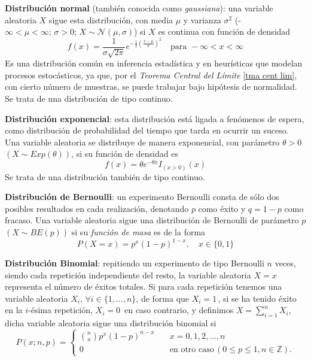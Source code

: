 {\bf Distribución normal} (también conocida como \textsl{gaussiana}): una variable aleatoria $X$ sigue esta distribución, con media $\mu$ y varianza $\sigma^2$ (-$\infty < \mu < \infty;\, \sigma > 0$; $X \sim \mathcal{N}\left(\mu, \sigma\right)$) si $X$ es continua con función de densidad
\begin{equation*}
    f(x) = \frac{1}{\sigma \sqrt{2\pi}} e^{-\frac{1}{2} \left(\frac{x - \mu}{\sigma}\right)^2}
    \quad \text{para } -\infty < x < \infty
\end{equation*}
Es una distribución común en inferencia estadística y en heurísticas que modelan procesos estocásticos, ya que, por el {\sl Teorema Central del Límite} \ref{tma cent lim}, con cierto número de muestras, se puede trabajar bajo hipótesis de normalidad. Se trata de una distribución de tipo continuo.

{\bf Distribución exponencial}: esta distribución está ligada a fenómenos de espera, como distribución de probabilidad del tiempo que tarda en ocurrir un suceso. Una variable aleatoria se distribuye de manera exponencial, con parámetro $\theta > 0$ $\left(X \sim Exp\left(\theta\right)\right)$, si su función de densidad es
\begin{equation*}
    f(x) = \theta e^{-\theta x} I_{(x>0)}(x)
    \label{eq:exponential_distribution}
\end{equation*}
Se trata de una distribución también de tipo continuo.

{\bf Distribución de Bernoulli}: un experimento Bernoulli consta de sólo dos posibles resultados en cada realización, denotando $p$ como éxito y $q = 1 - p$ como fracaso. Una variable aleatoria sigue una distribución de Bernoulli de parámetro $p$ $\left(X \sim BE\left(p\right)\right)$ si su {\sl función de masa} es de la forma
\begin{equation*}
    P(X = x) = p^x (1-p)^{1-x}, \quad x \in \{0, 1\}
    \label{eq:bernoulli_distribution}
\end{equation*}

{\bf Distribución Binomial}: repitiendo un experimento de tipo Bernoulli $n$ veces, siendo cada repetición independiente del resto, la variable aleatoria $X=x$ representa el número de éxitos totales. Si para cada repetición tenemos una variable aleatoria $X_i,\, \forall i \in \{1, \dots, n\}$, de forma que $X_i = 1$\,, si se ha tenido éxito en la $i$-ésima repetición,  $X_i = 0$\, en caso contrario, y definimos $X = \displaystyle\sum_{i=1}^{n}X_i$, dicha variable aleatoria sigue una distribución binomial si
\begin{equation*}
P(x; n, p) = 
\begin{cases} 
    \binom{n}{x} p^x (1-p)^{n-x} \quad & x = 0, 1, 2, \ldots, n \\ 
    0 & \text{en otro caso} \,(0 \leq p \leq 1,  n \in \mathbb{Z}).
\end{cases}
\label{eq:binomial_distribution}
\end{equation*}

